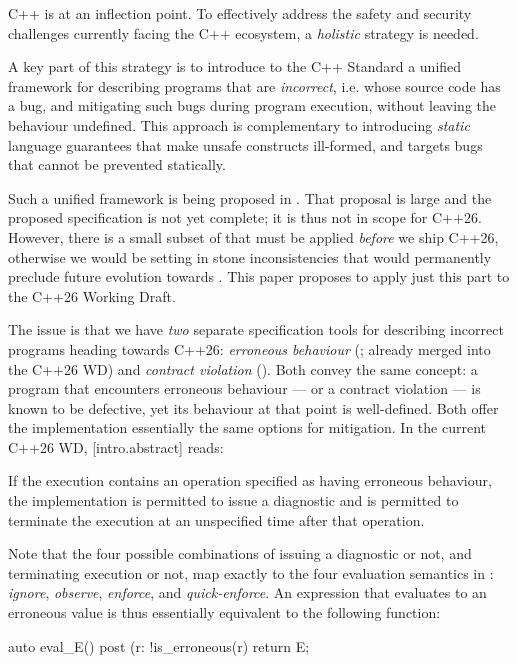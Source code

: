 C++ is at an inflection point. To effectively address the safety and security challenges currently facing the C++ ecosystem, a \emph{holistic} strategy is needed.

A key part of this strategy is to introduce to the C++ Standard a unified framework for describing programs that are \emph{incorrect}, i.e. whose source code has a bug, and mitigating such bugs during program execution, without leaving the behaviour undefined. This approach is complementary to introducing \emph{static} language guarantees that make unsafe constructs ill-formed, and targets bugs that cannot be prevented statically.

Such a unified framework is being proposed in \cite{P3100R1}. That proposal is large and the proposed specification is not yet complete; it is thus not in scope for C++26. However, there is a small subset of \cite{P3100R1} that must be applied \emph{before} we ship C++26, otherwise we would be setting in stone inconsistencies that would permanently preclude future evolution towards \cite{P3100R1}. This paper proposes to apply just this part to the C++26 Working Draft.

The issue is that we have \emph{two} separate specification tools for describing incorrect programs heading towards C++26: \emph{erroneous behaviour} (\cite{P2795R5}; already merged into the C++26 WD) and \emph{contract violation} (\cite{P2900R13}). Both convey the same concept: a program that encounters erroneous behaviour --- or a contract violation --- is known to be defective, yet its behaviour at that point is well-defined. Both offer the implementation essentially the same options for mitigation. In the current C++26 WD, [intro.abstract] reads:
\begin{adjustwidth}{0.5cm}{0.5cm}
If the execution contains an operation specified as having erroneous behaviour, the implementation is permitted to issue a diagnostic and is permitted to terminate the execution at an unspecified time after that operation.
\end{adjustwidth}
Note that the four possible combinations of issuing a diagnostic or not, and terminating execution or not, map exactly to the four evaluation semantics in \cite{P2900R13}: \emph{ignore}, \emph{observe}, \emph{enforce}, and \emph{quick-enforce}. An expression  that evaluates to an erroneous value is thus essentially equivalent to the following function:

\begin{codeblock}
auto eval_E() 
post (r: !is_erroneous(r) { 
  return E;
}
\end{codeblock}

